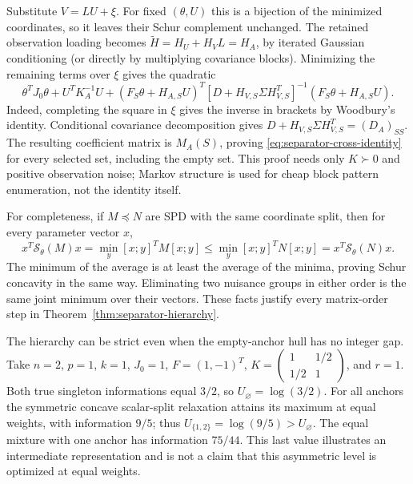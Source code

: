 Substitute $V=LU+\xi$. For fixed $(\theta,U)$ this is a bijection of the
minimized coordinates, so it leaves their Schur complement unchanged.
The retained observation loading becomes
$\widetilde H=H_U+H_VL=H_A$, by iterated Gaussian conditioning (or directly
by multiplying covariance blocks). Minimizing the remaining terms over $\xi$
gives the quadratic
\[
 \theta^TJ_0\theta+U^TK_A^{-1}U
 +(F_S\theta+H_{A,S}U)^T
 [D+H_{V,S}\Sigma H_{V,S}^T]^{-1}
 (F_S\theta+H_{A,S}U).
\]
Indeed, completing the square in $\xi$ gives the inverse in brackets by
Woodbury's identity. Conditional covariance decomposition gives
$D+H_{V,S}\Sigma H_{V,S}^T=(D_A)_{SS}$.
The resulting coefficient matrix is $M_A(S)$, proving
\eqref{eq:separator-cross-identity} for every selected set, including the
empty set. This proof needs only $K\succ0$ and positive observation noise;
Markov structure is used for cheap block pattern enumeration, not the
identity itself.

For completeness, if $M\preceq N$ are SPD with the same coordinate split,
then for every parameter vector $x$,
\[
 x^T\mathcal S_\theta(M)x
 =\min_y[x;y]^TM[x;y]
 \le\min_y[x;y]^TN[x;y]
 =x^T\mathcal S_\theta(N)x.
\]
The minimum of the average is at least the average of the minima, proving
Schur concavity in the same way. Eliminating two nuisance groups in either
order is the same joint minimum over their vectors. These facts justify
every matrix-order step in Theorem~\ref{thm:separator-hierarchy}.

The hierarchy can be strict even when the empty-anchor hull has no integer
gap. Take $n=2$, $p=1$, $k=1$, $J_0=1$, $F=(1,-1)^T$,
$K=\left(\begin{smallmatrix}1&1/2\\1/2&1\end{smallmatrix}\right)$,
and $r=1$. Both true singleton informations equal $3/2$, so
$U_\varnothing=\log(3/2)$. For all anchors the symmetric concave scalar-split
relaxation attains its maximum at equal weights, with information $9/5$;
thus $U_{\{1,2\}}=\log(9/5)>U_\varnothing$.
The equal mixture with one anchor has information $75/44$.
This last value illustrates an intermediate representation and is not a
claim that this asymmetric level is optimized at equal weights.

